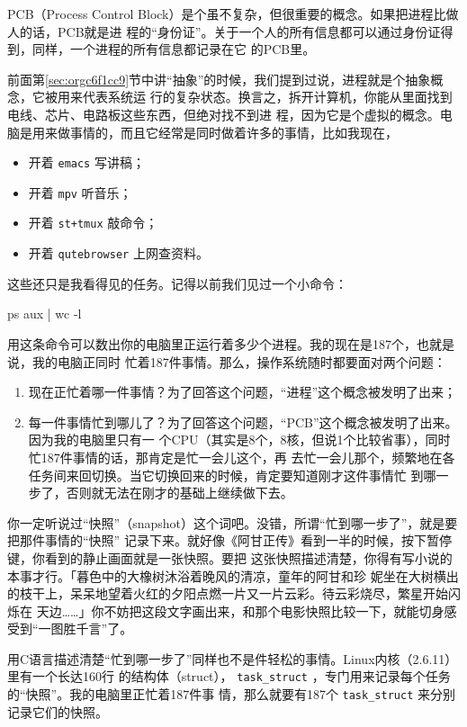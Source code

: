 \documentclass{wx672ctexart}
\newcommand\mpic[1]{%
  \marginpar{\texttt{[image: thumbnails/\#1]}}}
\begin{document}
\mpic{pg_0054}PCB（Process Control Block）是个虽不复杂，但很重要的概念。如果把进程比做人的话，PCB就是进
程的“身份证”。关于一个人的所有信息都可以通过身份证得到，同样，一个进程的所有信息都记录在它
的PCB里。

前面第\ref{sec:orgc6f1cc9}节中讲“抽象”的时候，我们提到过说，进程就是个抽象概念，它被用来代表系统运
行的复杂状态。换言之，拆开计算机，你能从里面找到电线、芯片、电路板这些东西，但绝对找不到进
程，因为它是个虚拟的概念。电脑是用来做事情的，而且它经常是同时做着许多的事情，比如我现在，
\begin{itemize}
\item 开着 \texttt{emacs} 写讲稿；
\item 开着 \texttt{mpv} 听音乐；
\item 开着 \texttt{st+tmux} 敲命令；
\item 开着 \texttt{qutebrowser} 上网查资料。
\end{itemize}
这些还只是我看得见的任务。记得以前我们见过一个小命令：
\begin{shellcode}
ps aux | wc -l
\end{shellcode}
用这条命令可以数出你的电脑里正运行着多少个进程。我的现在是187个，也就是说，我的电脑正同时
忙着187件事情。那么，操作系统随时都要面对两个问题：
\begin{enumerate}
\item 现在正忙着哪一件事情？为了回答这个问题，“进程”这个概念被发明了出来；
\item 每一件事情忙到哪儿了？为了回答这个问题，“PCB”这个概念被发明了出来。因为我的电脑里只有一
个CPU（其实是8个，8核，但说1个比较省事），同时忙187件事情的话，那肯定是忙一会儿这个，再
去忙一会儿那个，频繁地在各任务间来回切换。当它切换回来的时候，肯定要知道刚才这件事情忙
到哪一步了，否则就无法在刚才的基础上继续做下去。
\end{enumerate}

你一定听说过“快照”（snapshot）这个词吧。没错，所谓“忙到哪一步了”，就是要把那件事情的“快照”
记录下来。就好像《阿甘正传》看到一半的时候，按下暂停键，你看到的静止画面就是一张快照。要把
这张快照描述清楚，你得有写小说的本事才行。「暮色中的大橡树沐浴着晚风的清凉，童年的阿甘和珍
妮坐在大树横出的枝干上，呆呆地望着火红的夕阳点燃一片又一片云彩。待云彩烧尽，繁星开始闪烁在
天边……」你不妨把这段文字画出来，和那个电影快照比较一下，就能切身感受到“一图胜千言”了。

用C语言描述清楚“忙到哪一步了”同样也不是件轻松的事情。Linux内核（2.6.11）里有一个长达160行
的结构体（struct）， \texttt{task\_struct} ，专门用来记录每个任务的“快照”。我的电脑里正忙着187件事
情，那么就要有187个 \texttt{task\_struct} 来分别记录它们的快照。
\end{document}
